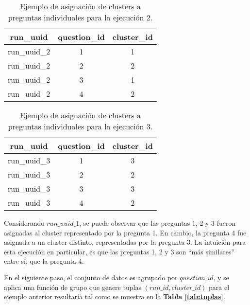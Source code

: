 \begin{table}[]
	\centering
	\begin{tabular}{|c|c|c|}
		\hline
		\textbf{run\_uuid} & \textbf{question\_id} & \textbf{cluster\_id} \\ \hline
		run\_uuid\_2       & 1                     & 1                    \\ \hline
		run\_uuid\_2       & 2                     & 2                    \\ \hline
		run\_uuid\_2       & 3                     & 1                    \\ \hline
		run\_uuid\_2       & 4                     & 2                    \\ \hline
	\end{tabular}
	\caption{Ejemplo de asignación de clusters a preguntas individuales para la ejecución 2.}
	\label{tab:run2}
\end{table}

\begin{table}[]
	\centering
	\begin{tabular}{|c|c|c|}
		\hline
		\textbf{run\_uuid} & \textbf{question\_id} & \textbf{cluster\_id} \\ \hline
		run\_uuid\_3       & 1                     & 3                    \\ \hline
		run\_uuid\_3       & 2                     & 2                    \\ \hline
		run\_uuid\_3       & 3                     & 3                    \\ \hline
		run\_uuid\_3       & 4                     & 2                    \\ \hline
	\end{tabular}
	\caption{Ejemplo de asignación de clusters a preguntas individuales para la ejecución 3.}
	\label{tab:run3}
\end{table}

Considerando \(run\_uuid\_1\), se puede observar que las preguntas 1, 2 y 3 fueron asignadas al cluster representado por la pregunta 1. En cambio, la pregunta 4 fue asignada a un cluster distinto, representadas por la pregunta 3. La intuición para esta ejecución en particular, es que las preguntas 1, 2 y 3 son “más similares” entre sí, que la pregunta 4.

\bigskip En el siguiente paso, el conjunto de datos es agrupado por \(question\_id\), y se aplica una función de grupo que genere tuplas \((run\_id, cluster\_id)\) para el ejemplo anterior resultaría tal como se muestra en la \textbf{Tabla \ref{tab:tuplas}}.

